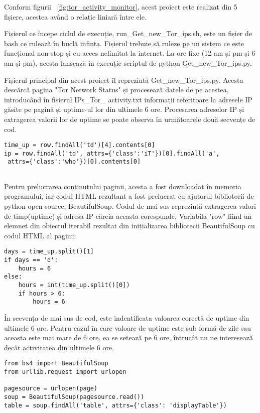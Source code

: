 Conform figurii ~\ref{fig:tor_activity_monitor},  acest proiect este realizat din 5 fișiere, acestea având o relație liniară între ele.

Fișierul ce începe ciclul de execuție,  run\_Get\_new\_Tor\_ips.sh, este un fișier de bash ce rulează în buclă infinta. Fișierul trebuie să ruleze pe un sistem ce este funcțional non-stop și cu acces nelimitat la internet. La ore fixe (12 am și pm și 6 am și pm), acesta lansează în execuție scriptul de python  Get\_new\_Tor\_ips.py.

Fișierul principal din acest proiect îl reprezintă  Get\_new\_Tor\_ips.py.  Acesta descărcă pagina "Tor Network Status" \cite{tot_status}  și procesează datele de pe acestea, introducând în fișierul IPs\_Tor\_ activity.txt  informații referitoare la adresele IP găsite pe pagină și uptime-ul lor din ultimele 6 ore. Procesarea adreselor IP și extragerea valorii lor de uptime se poate observa în următoarele două secvențe de cod. 

\lstset{language=python,frame=single, showstringspaces=false}
\begin{lstlisting}
time_up = row.findAll('td')[4].contents[0]
ip = row.findAll('td', attrs={'class':'iT'})[0].findAll('a',
 attrs={'class':'who'})[0].contents[0]


\end{lstlisting}

Pentru prelucrarea conținutului paginii, acesta a fost downloadat în memoria programului, iar codul HTML rezultant a fost prelucrat cu ajutorul bibliotecii de python open source, BeautifulSoup. Codul de mai sus reprezintă extragerea valori de timp(uptime) și adresa IP căreia aceasta corespunde. Variabila "row" fiind un elemnet din obiectul iterabil rezultat din inițializarea bibliotecii BeautifulSoup cu codul HTML al paginii. 

\lstset{language=python,frame=single, showstringspaces=false}
\begin{lstlisting}
days = time_up.split()[1]
if days == 'd':
    hours = 6
else:
    hours = int(time_up.split()[0])
    if hours > 6:
        hours = 6

\end{lstlisting}

În secvența de mai sus de cod, este indentificata valoarea corectă de uptime din ultimele 6 ore. Pentru cazul în care valoare de uptime este sub formă de zile sau aceasta este mai mare de 6 ore, ea se setează pe 6 ore, întrucât nu ne interesează decât activitatea din ultimele 6 ore. 
\begin{lstlisting}
from bs4 import BeautifulSoup
from urllib.request import urlopen

pagesource = urlopen(page)
soup = BeautifulSoup(pagesource.read())
table = soup.findAll('table', attrs={'class': 'displayTable'})
\end{lstlisting}

